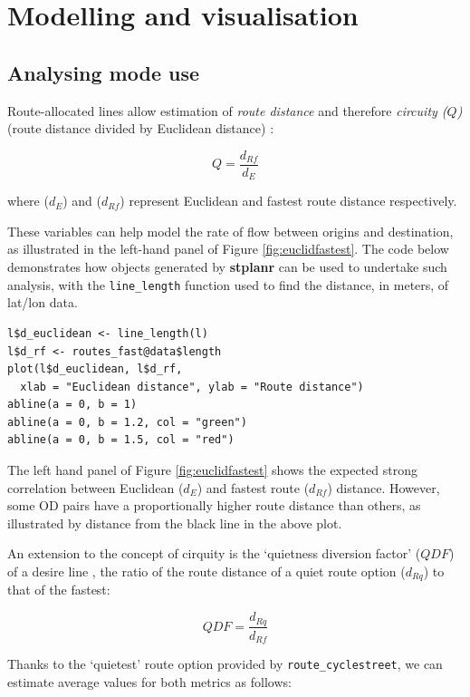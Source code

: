 \section{Modelling and visualisation}\label{modelling-and-visualisation}

\subsection{Analysing mode use}\label{modelling-mode-choice}

Route-allocated lines allow estimation of \emph{route distance} and therefore
\emph{circuity ($Q$)} (route distance divided by Euclidean distance)
\citep{levinson_minimum_2009}:

\[
 Q = \frac{d_{Rf}}{d_E}
\]

where (\(d_E\)) and (\(d_{Rf}\)) represent
Euclidean and fastest route distance respectively.

These
variables can help model the rate of flow between origins and
destination, as illustrated in the left-hand panel of Figure
\ref{fig:euclidfastest}. The code below demonstrates how objects
generated by \textbf{stplanr} can be used to undertake such analysis,
with the \texttt{line\_length} function used to find the distance, in
meters, of lat/lon data.

\begin{verbatim}
l$d_euclidean <- line_length(l)
l$d_rf <- routes_fast@data$length
plot(l$d_euclidean, l$d_rf,
  xlab = "Euclidean distance", ylab = "Route distance")
abline(a = 0, b = 1)
abline(a = 0, b = 1.2, col = "green")
abline(a = 0, b = 1.5, col = "red")
\end{verbatim}

The left hand panel of Figure \ref{fig:euclidfastest} shows the expected
strong correlation between Euclidean (\(d_E\)) and fastest route
(\(d_{Rf}\)) distance. However, some OD pairs have a proportionally
higher route distance than others, as illustrated by distance from the
black line in the above plot.

An extension to the concept of cirquity is the `quietness diversion
factor' (\(QDF\)) of a desire line \citep{lovelace_propensity_2017}, the
ratio of the route distance of a quiet route option (\(d_{Rq}\)) to that
of the fastest:

\[
 QDF = \frac{d_{Rq}}{d_{Rf}}
\]

Thanks to the `quietest' route option provided by
\texttt{route\_cyclestreet}, we can estimate average values for both
metrics as follows:

